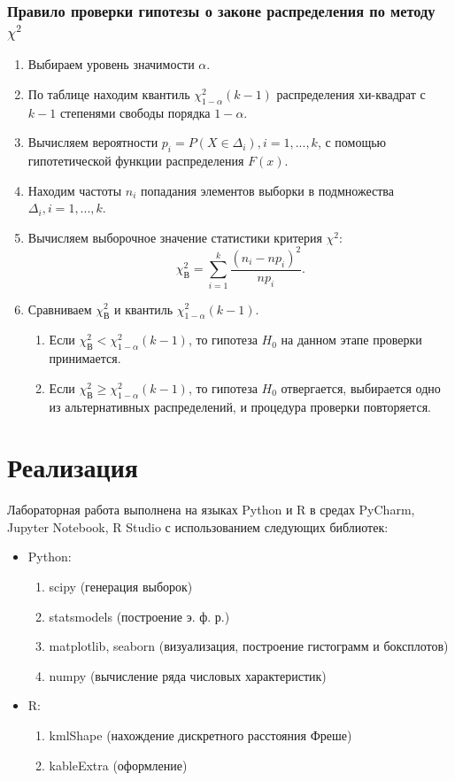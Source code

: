 \documentclass[a4paper]{article}
\begin{document}
\subsubsection*{Правило проверки гипотезы о законе распределения по методу $\chi^2$}
\begin{enumerate}
    \item Выбираем уровень значимости $\alpha$.
    \item По таблице \cite[с. 358]{book1} находим квантиль $\chi_{1-\alpha}^2(k-1)$ распределения хи-квадрат с $k-1$ степенями свободы порядка $1-\alpha$.
    \item Вычисляем вероятности $p_i=P(X\in\Delta_i), i = 1,...,k$, с помощью гипотетической функции распределения $F(x)$.
    \item Находим частоты $n_i$ попадания элементов выборки в подмножества $\Delta_i,i=1,...,k$.
    \item Вычисляем выборочное значение статистики критерия $\chi^2$:
        \begin{equation*}
            \chi^2_{\text{В}}=\sum_{i=1}^k\frac{(n_i-np_i)^2}{np_i}.
        \end{equation*}
    \item Сравниваем $\chi^2_{\text{В}}$ и квантиль $\chi_{1-\alpha}^2(k-1)$.
        \begin{enumerate}
            \item Если $\chi^2_{\text{В}}<\chi_{1-\alpha}^2(k-1)$, то гипотеза $H_0$ на данном этапе проверки принимается.
            \item Если $\chi^2_{\text{В}}\geq\chi_{1-\alpha}^2(k-1)$, то гипотеза $H_0$ отвергается, выбирается одно из альтернативных распределений, и процедура проверки повторяется.

        \end{enumerate}
\end{enumerate}
\section{Реализация}
Лабораторная работа выполнена на языках Python и R в средах PyCharm, Jupyter Notebook, R Studio с использованием следующих библиотек:
\begin{itemize}
    \item Python:
    \begin{enumerate}
        \item scipy (генерация выборок)
        \item statsmodels (построение э. ф. р.)
        \item matplotlib, seaborn (визуализация, построение гистограмм и боксплотов)
        \item numpy (вычисление ряда числовых характеристик)
    \end{enumerate}
    \item R:
    \begin{enumerate}
        \item kmlShape (нахождение дискретного расстояния Фреше)
        \item kableExtra (оформление)
\end{enumerate}
\end{itemize}
\end{document}
